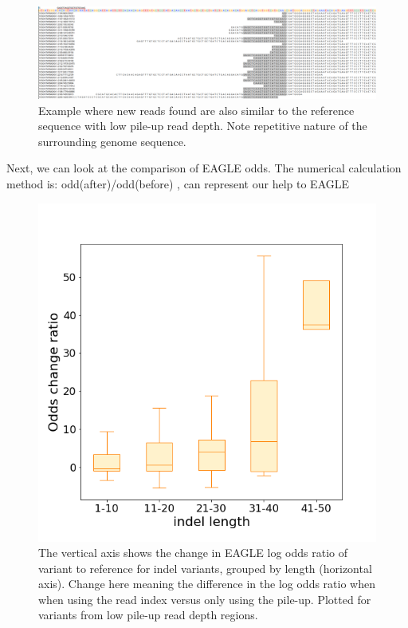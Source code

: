 \vspace{1cm}
\begin{figure}[H]
    \centering
    \includegraphics[width=1\columnwidth]{body/image/low_new_REFread.png}
    \captionsetup{labelfont=bf}
    \renewcommand{\baselinestretch}{1.0}
    \vspace{-1cm}
    \caption[New reads are similar to the reference with low pile-up read depth]{Example where new reads found are also similar to the reference sequence with low pile-up read depth.  Note repetitive nature of the surrounding genome sequence.}
    \label{low_new_REFread}
\end{figure}

Next, we can look at the comparison of EAGLE odds. 
The numerical calculation method is:
odd(after)/odd(before)
, can represent our help to EAGLE

\vspace{1cm}
\begin{figure}[H]
    \centering
    \includegraphics[width=0.6\columnwidth]{body/image/low_odds_change.png}
    \captionsetup{labelfont=bf}
    \renewcommand{\baselinestretch}{1.0}
    \caption[low pile-up read depth odds change ratio]{The vertical axis shows the change in EAGLE log odds ratio of variant to reference for indel variants, grouped by length (horizontal axis).  Change here meaning the difference in the log odds ratio when when using the read index versus only using the pile-up.  Plotted for variants from low pile-up read depth regions.}
    \label{low_odds_change}
\end{figure}

